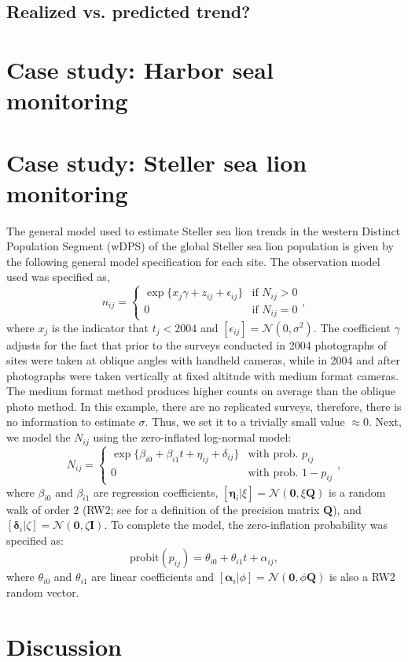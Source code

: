\documentclass[12pt,letter]{article}
\newcommand{\Nij}{\ensuremath{N_{ij}}}
\newcommand{\fN}{\ensuremath{\mathcal{N}}}
\begin{document}
\subsection{Realized vs. predicted trend?}

 

\section{Case study: Harbor seal monitoring}

\section{Case study: Steller sea lion monitoring}

The general model used to estimate Steller sea lion trends in the western Distinct Population Segment (wDPS) of the global Steller sea lion population is given by the following general model specification for each site. The observation model used was specified as,
\begin{equation}
n_{ij} = \left\{
	\begin{array}{ll} 
	\exp\{x_j \gamma + z_{ij} + \epsilon_{ij}\}& \mbox{if } N_{ij}>0\\
	0 & \mbox{if } N_{ij}=0
	\end{array}\right.,
\end{equation}
where $x_j$ is the indicator that $t_j < 2004$ and $[\epsilon_{ij}]=\fN(0,\sigma^2)$. The coefficient $\gamma$ adjusts for the fact that prior to the surveys conducted in 2004 photographs of sites were taken at oblique angles with handheld cameras, while in 2004 and after photographs were taken vertically at fixed altitude with medium format cameras. The medium format method produces higher counts on average than the oblique photo method. In this example, there are no replicated surveys, therefore, there is no information to estimate $\sigma$. Thus, we set it to a trivially small value $\approx 0$. Next, we model the $\Nij$ using the zero-inflated log-normal model:
\begin{equation}
N_{ij} = \left\{
	\begin{array}{ll}
		\exp\{\beta_{i0} + \beta_{i1}t + \eta_{ij} + \delta_{ij}\} & \mbox{with prob. } p_{ij}\\
		0 & \mbox{with prob. } 1-p_{ij}
	\end{array}\right.,
\end{equation}
where $\beta_{i0}$ and $\beta_{i1}$ are regression coefficients, $[\boldsymbol{\eta}_i|\xi] = \fN(\mathbf{0},\xi\mathbf{Q})$ is a random walk of order 2 (RW2; see \citealt{} for a definition of the precision matrix $\mathbf{Q}$), and $[\boldsymbol{\delta}_i|\zeta] = \fN(\mathbf{0},\zeta\mathbf{I})$. 
To complete the model, the zero-inflation probability was specified as:
\begin{equation}
\mbox{probit}(p_{ij}) = \theta_{i0} + \theta_{i1}t + \alpha_{ij},
\end{equation}
where $\theta_{i0}$ and $\theta_{i1}$ are linear coefficients and $[\boldsymbol{\alpha}_i|\phi] = \fN(\mathbf{0},\phi\mathbf{Q})$ is also a RW2 random vector. 



\section{Discussion}

\nocite{*}


\end{document}
